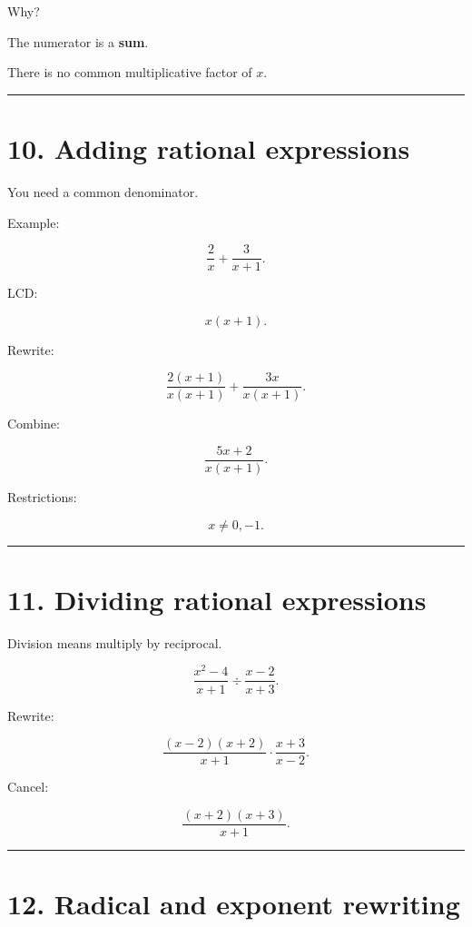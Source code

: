 \documentclass[
]{article}
\begin{document}
Why?

The numerator is a \textbf{sum}.

There is no common multiplicative factor of \(x\).

\begin{center}\rule{0.5\linewidth}{0.5pt}\end{center}

\section{10. Adding rational
expressions}\label{adding-rational-expressions}

You need a common denominator.

Example:

\[
\frac{2}{x}+\frac{3}{x+1}.
\]

LCD:

\[
x(x+1).
\]

Rewrite:

\[
\frac{2(x+1)}{x(x+1)}
+
\frac{3x}{x(x+1)}.
\]

Combine:

\[
\boxed{\frac{5x+2}{x(x+1)}}.
\]

Restrictions:

\[
x\neq0,-1.
\]

\begin{center}\rule{0.5\linewidth}{0.5pt}\end{center}

\section{11. Dividing rational
expressions}\label{dividing-rational-expressions}

Division means multiply by reciprocal.

\[
\frac{x^2-4}{x+1}
\div
\frac{x-2}{x+3}.
\]

Rewrite:

\[
\frac{(x-2)(x+2)}{x+1}
\cdot
\frac{x+3}{x-2}.
\]

Cancel:

\[
\boxed{\frac{(x+2)(x+3)}{x+1}}.
\]

\begin{center}\rule{0.5\linewidth}{0.5pt}\end{center}

\section{12. Radical and exponent
rewriting}\label{radical-and-exponent-rewriting}
\end{document}

